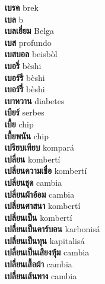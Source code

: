 \textbf{ เบรค  } brek \\
\textbf{ เบล  } b \\
\textbf{ เบลเยี่ยม  } Belga \\
\textbf{ เบส  } profundo \\
\textbf{ เบสบอล  } beisbòl \\
\textbf{ เบอรี่  } bèshi \\
\textbf{ เบอร์รี  } bèshi \\
\textbf{ เบอร์รี่  } bèshi \\
\textbf{ เบาหวาน  } diabetes \\
\textbf{ เบียร์  } serbes \\
\textbf{ เบี้ย  } chip \\
\textbf{ เบี้ยพนัน  } chip \\
\textbf{ เปรียบเทียบ  } kompará \\
\textbf{ เปลี่ยน  } kombertí \\
\textbf{ เปลี่ยนความเชื่อ  } kombertí \\
\textbf{ เปลี่ยนชุด  } cambia \\
\textbf{ เปลี่ยนผ้าอ้อม  } cambia \\
\textbf{ เปลี่ยนศาสนา  } kombertí \\
\textbf{ เปลี่ยนเป็น  } kombertí \\
\textbf{ เปลี่ยนเป็นคาร์บอน  } karbonisá \\
\textbf{ เปลี่ยนเป็นทุน  } kapitalisá \\
\textbf{ เปลี่ยนเป็นเสียงทุ้ม  } cambia \\
\textbf{ เปลี่ยนเสื้อผ้า  } cambia \\
\textbf{ เปลี่ยนเส้นทาง  } cambia \\
